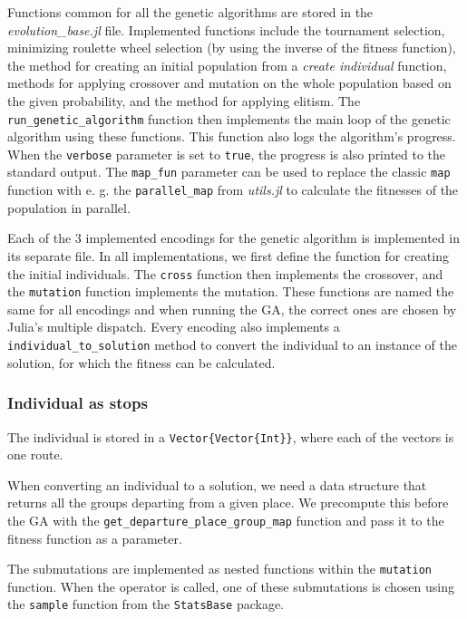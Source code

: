 Functions common for all the genetic algorithms are stored in the \textit{evolution\_base.jl} file. Implemented functions include the tournament selection, minimizing roulette wheel selection (by using the inverse of the fitness function), the method for creating an initial population from a \textit{create individual} function, methods for applying crossover and mutation on the whole population based on the given probability, and the method for applying elitism. The \texttt{run\_genetic\_algorithm} function then implements the main loop of the genetic algorithm using these functions. This function also logs the algorithm's progress. When the \texttt{verbose} parameter is set to \texttt{true}, the progress is also printed to the standard output. The \texttt{map\_fun} parameter can be used to replace the classic \texttt{map} function with e. g. the \texttt{parallel\_map} from \textit{utils.jl} to calculate the fitnesses of the population in parallel. 

Each of the 3 implemented encodings for the genetic algorithm is implemented in its separate file. In all implementations, we first define the function for creating the initial individuals. The \texttt{cross} function then implements the crossover, and the \texttt{mutation} function implements the mutation. These functions are named the same for all encodings and when running the GA, the correct ones are chosen by Julia's multiple dispatch. Every encoding also implements a \texttt{individual\_to\_solution} method to convert the individual to an instance of the solution, for which the fitness can be calculated.

\subsubsection{Individual as stops}

The individual is stored in a \texttt{Vector\{Vector\{Int\}\}}, where each of the vectors is one route.

When converting an individual to a solution, we need a data structure that returns all the groups departing from a given place. We precompute this before the GA with the \texttt{get\_departure\_place\_group\_map} function and pass it to the fitness function as a parameter.

The submutations are implemented as nested functions within the \texttt{mutation} function. When the operator is called, one of these submutations is chosen using the \texttt{sample} function from the \texttt{StatsBase} package.

